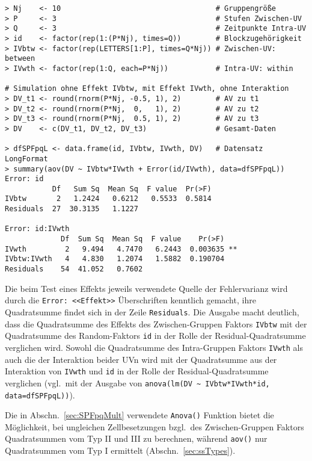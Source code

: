 \begin{lstlisting}
> Nj    <- 10                                    # Gruppengröße
> P     <- 3                                     # Stufen Zwischen-UV
> Q     <- 3                                     # Zeitpunkte Intra-UV
> id    <- factor(rep(1:(P*Nj), times=Q))        # Blockzugehörigkeit
> IVbtw <- factor(rep(LETTERS[1:P], times=Q*Nj)) # Zwischen-UV: between
> IVwth <- factor(rep(1:Q, each=P*Nj))           # Intra-UV: within

# Simulation ohne Effekt IVbtw, mit Effekt IVwth, ohne Interaktion
> DV_t1 <- round(rnorm(P*Nj, -0.5, 1), 2)        # AV zu t1
> DV_t2 <- round(rnorm(P*Nj,  0,   1), 2)        # AV zu t2
> DV_t3 <- round(rnorm(P*Nj,  0.5, 1), 2)        # AV zu t3
> DV    <- c(DV_t1, DV_t2, DV_t3)                # Gesamt-Daten

> dfSPFpqL <- data.frame(id, IVbtw, IVwth, DV)   # Datensatz LongFormat
> summary(aov(DV ~ IVbtw*IVwth + Error(id/IVwth), data=dfSPFpqL))
Error: id
           Df   Sum Sq  Mean Sq  F value  Pr(>F)
IVbtw       2   1.2424   0.6212   0.5533  0.5814
Residuals  27  30.3135   1.1227

Error: id:IVwth
             Df  Sum Sq  Mean Sq  F value    Pr(>F)
IVwth         2   9.494   4.7470   6.2443  0.003635 **
IVbtw:IVwth   4   4.830   1.2074   1.5882  0.190704
Residuals    54  41.052   0.7602
\end{lstlisting}

Die beim Test eines Effekts jeweils verwendete Quelle der Fehlervarianz wird durch die \lstinline!Error: <<Effekt>>! Überschriften kenntlich gemacht, ihre Quadratsumme findet sich in der Zeile \lstinline!Residuals!. Die Ausgabe macht deutlich, dass die Quadratsumme des Effekts des Zwischen-Gruppen Faktors \lstinline!IVbtw! mit der Quadratsumme des Random-Faktors \lstinline!id! in der Rolle der Residual-Quadratsumme verglichen wird. Sowohl die Quadratsumme des Intra-Gruppen Faktors \lstinline!IVwth! als auch die der Interaktion beider UVn wird mit der Quadratsumme aus der Interaktion von \lstinline!IVwth! und \lstinline!id! in der Rolle der Residual-Quadratsumme verglichen (vgl.\ mit der Ausgabe von \lstinline!anova(lm(DV ~ IVbtw*IVwth*id, data=dfSPFpqL))!).

Die in Abschn.\ \ref{sec:SPFpqMult} verwendete \lstinline!Anova()! Funktion bietet die Möglichkeit, bei ungleichen Zellbesetzungen bzgl.\ des Zwischen-Gruppen Faktors Quadratsummen vom Typ II und III zu berechnen, während \lstinline!aov()! nur Quadratsummen vom Typ I ermittelt (Abschn.\ \ref{sec:ssTypes}).

